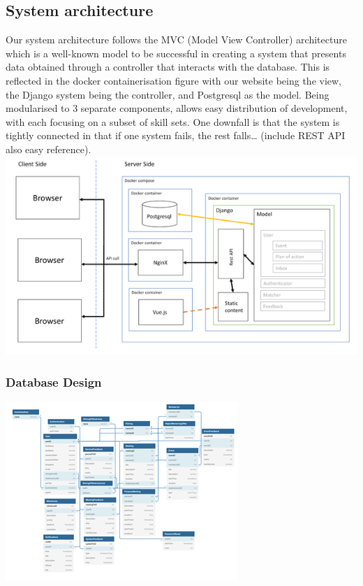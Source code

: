 \documentclass[10pt]{article}
\begin{document}
\subsection{System architecture}
Our system architecture follows the MVC (Model View Controller) architecture
which is a well-known model to be successful in creating a system that presents
data obtained through a controller that interacts with the database. This is
reflected in the docker containerisation figure with our website being the view,
the Django system being the controller, and Postgresql as the model. Being
modularised to 3 separate components, allows easy distribution of development,
with each focusing on a subset of skill sets. One downfall is that the system is
tightly connected in that if one system fails, the rest falls… (include REST API
also easy reference).\\
\includegraphics{architecture}

\subsubsection{Database Design}
\includegraphics{DB}
\end{document}
